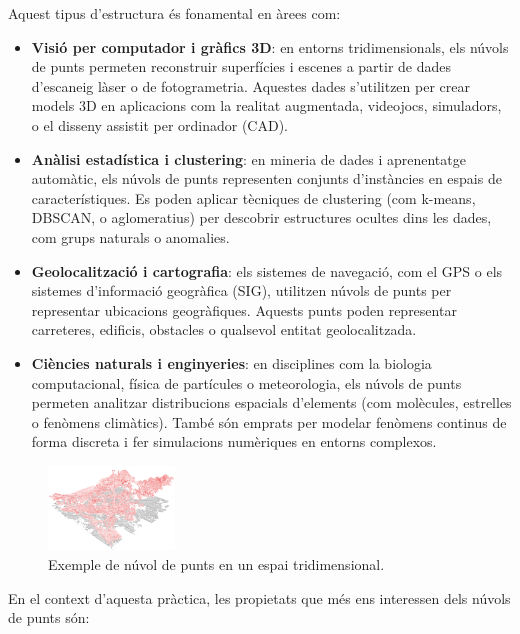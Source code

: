 \documentclass{ieeetj}
\begin{document}
Aquest tipus d’estructura és fonamental en àrees com:
\begin{itemize}
    \item \textbf{Visió per computador i gràfics 3D}: en entorns tridimensionals, els núvols de punts permeten reconstruir superfícies i escenes a partir de dades d’escaneig làser o de fotogrametria. Aquestes dades s’utilitzen per crear models 3D en aplicacions com la realitat augmentada, videojocs, simuladors, o el disseny assistit per ordinador (CAD). 

    \item \textbf{Anàlisi estadística i clustering}: en mineria de dades i aprenentatge automàtic, els núvols de punts representen conjunts d’instàncies en espais de característiques. Es poden aplicar tècniques de clustering (com k-means, DBSCAN, o aglomeratius) per descobrir estructures ocultes dins les dades, com grups naturals o anomalies. 

    \item \textbf{Geolocalització i cartografia}: els sistemes de navegació, com el GPS o els sistemes d’informació geogràfica (SIG), utilitzen núvols de punts per representar ubicacions geogràfiques. Aquests punts poden representar carreteres, edificis, obstacles o qualsevol entitat geolocalitzada. 

    \item \textbf{Ciències naturals i enginyeries}: en disciplines com la biologia computacional, física de partícules o meteorologia, els núvols de punts permeten analitzar distribucions espacials d’elements (com molècules, estrelles o fenòmens climàtics). També són emprats per modelar fenòmens continus de forma discreta i fer simulacions numèriques en entorns complexos.

\end{itemize}

\begin{figure}[htbp]
    \centerline{\includegraphics[width=0.3\textwidth]{png/nuvolPunts.png}}
    \caption{Exemple de núvol de punts en un espai tridimensional.}
    \label{fig:nuvolDePunts}
\end{figure}

En el context d’aquesta pràctica, les propietats que més ens interessen dels núvols de punts són:
\end{document}
